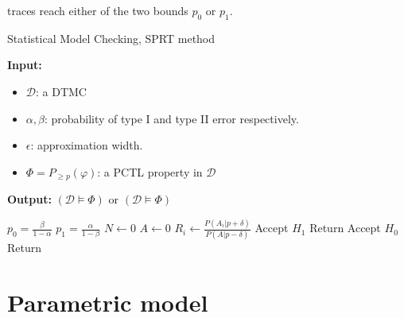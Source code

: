 traces reach either of the two bounds $p_0$ or $p_1$.
\begin{algorithm}[H]
      \caption{Statistical Model Checking, SPRT method}
      \label{alg:smc-sprt}
      \footnotesize{
            \hspace*{\algorithmicindent} \textbf{Input:}
            \begin{itemize}
                  \item $\mathcal{D}$: a DTMC
                  \item $\alpha, \beta$: probability of type I and type II error respectively.
                  \item $\epsilon$: approximation width.
                  \item $\Phi = P_{\geq p}(\varphi)$: a PCTL property in $\mathcal{D}$
            \end{itemize}
            \hspace*{\algorithmicindent} \textbf{Output:} $(\mathcal{D} \models \Phi)$ or $(\mathcal{D} \models \Phi)$
      }
      \begin{algorithmic}[1]
            \State $p_0 = \frac{\beta}{1 - \alpha}$
            \State $p_1 = \frac{\alpha}{1 - \beta}$
            \State $N \leftarrow 0$
            \State $A \leftarrow 0$
            \State $R_i \leftarrow \frac{P(A_i | p + \delta)}{P(A | p - \delta)}$
            \State Accept $H_1$
            \State Return
            \Else
            \State Accept $H_0$
            \State Return
            \EndIf
            \EndIf
            \EndWhile
            \EndProcedure
      \end{algorithmic}
\end{algorithm}


\section{Parametric model}
